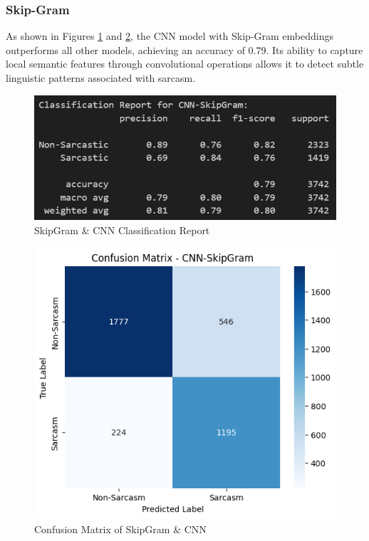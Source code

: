 \documentclass[11pt]{article}
\begin{document}
\subsubsection{Skip-Gram}
As shown in Figures \ref{fig:sgcnncr} and \ref{fig:sgcnncm}, the CNN model with Skip-Gram embeddings outperforms all other models, achieving an accuracy of 0.79. Its ability to capture local semantic features through convolutional operations allows it to detect subtle linguistic patterns associated with sarcasm.
\begin{figure}[htbp]
    \centering
    \includegraphics[width=.8\linewidth]{pic/CNN-Skipgram-Report.png}
    \caption{SkipGram \& CNN Classification Report}
    \label{fig:sgcnncr}
\end{figure}
\begin{figure}[htbp]
    \centering
    \includegraphics[width=.8\linewidth]{pic/CNN-Skipgram-Matrix.png}
    \caption{Confusion Matrix of SkipGram \& CNN}
    \label{fig:sgcnncm}
\end{figure}

\end{document}
